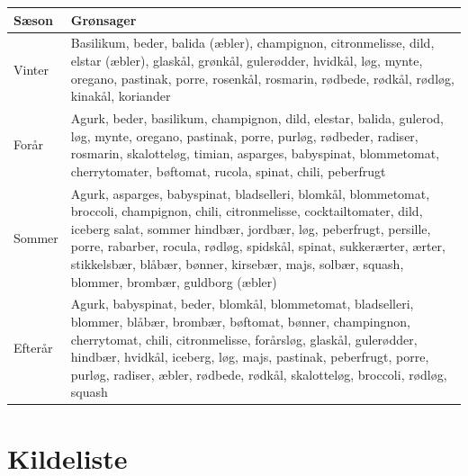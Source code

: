 \documentclass[11pt, a4paper]{article}
\begin{document}
\begin{longtable}{|l|p{10cm}|}
	\hline
	\textbf{Sæson} & \textbf{Grønsager}\\ \hline
    Vinter & Basilikum, beder, balida (æbler), champignon, citronmelisse, dild, elstar (æbler), glaskål, grønkål, gulerødder, hvidkål, løg, mynte, oregano, pastinak, porre, rosenkål, rosmarin, rødbede, rødkål, rødløg, kinakål, koriander\\ \hline
    Forår & Agurk, beder, basilikum, champignon, dild, elestar, balida, gulerod, løg, mynte, oregano, pastinak, porre, purløg, rødbeder, radiser, rosmarin, skalotteløg, timian, asparges, babyspinat, blommetomat, cherrytomater, bøftomat, rucola, spinat, chili, peberfrugt\\ \hline
    Sommer & Agurk, asparges, babyspinat, bladselleri, blomkål, blommetomat, broccoli, champignon, chili, citronmelisse, cocktailtomater, dild, iceberg salat, sommer hindbær, jordbær,  løg, peberfrugt, persille, porre, rabarber, rocula, rødløg, spidskål, spinat, sukkerærter, ærter, stikkelsbær, blåbær, bønner, kirsebær, majs, solbær, squash, blommer, brombær, guldborg (æbler)\\ \hline
    Efterår & Agurk, babyspinat, beder, blomkål, blommetomat, bladselleri, blommer, blåbær, brombær, bøftomat, bønner, champingnon, cherrytomat, chili, citronmelisse, forårsløg, glaskål, gulerødder, hindbær, hvidkål, iceberg, løg, majs, pastinak, peberfrugt, porre, purløg, radiser, æbler, rødbede, rødkål, skalotteløg, broccoli, rødløg, squash\\ \hline
\end{longtable}


\newpage
\section{Kildeliste}
\end{document}
